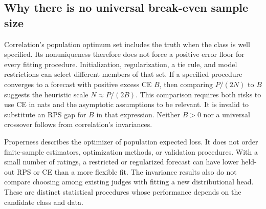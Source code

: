 \subsection{Why there is no universal break-even sample size}
Correlation's population optimum set includes the truth when the class is well specified.
Its nonuniqueness therefore does not force a positive error floor for every fitting procedure.
Initialization, regularization, a tie rule, and model restrictions can select different members of that set.
If a specified procedure converges to a forecast with positive excess CE $B$, then comparing $P/(2N)$ to $B$ suggests the heuristic scale $N\approx P/(2B)$.
This comparison requires both risks to use CE in nats and the asymptotic assumptions to be relevant.
It is invalid to substitute an RPS gap for $B$ in that expression.
Neither $B>0$ nor a universal crossover follows from correlation's invariances.

Properness describes the optimizer of population expected loss.
It does not order finite-sample estimators, optimization methods, or validation procedures.
With a small number of ratings, a restricted or regularized forecast can have lower held-out RPS or CE than a more flexible fit.
The invariance results also do not compare choosing among existing judges with fitting a new distributional head.
These are distinct statistical procedures whose performance depends on the candidate class and data.
